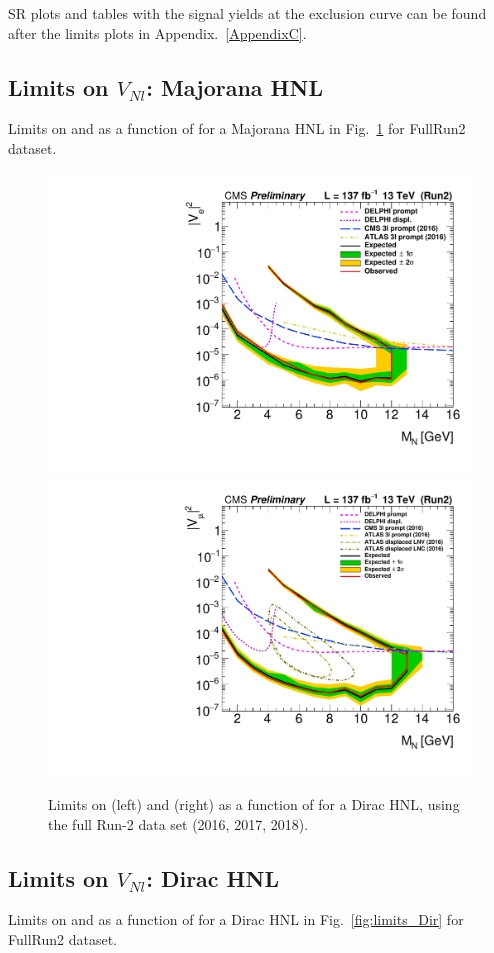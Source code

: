 SR plots and tables with the signal yields at the exclusion curve can be found after the limits plots in Appendix.~\ref{AppendixC}.
\subsection{Limits on $V_{Nl}$: Majorana HNL}
Limits on \mixpare and \mixparm as a function of \mhnl for a Majorana HNL in
Fig.~\ref{fig:limits_Maj} for FullRun2 dataset.
\begin{figure}[h]
  \centering
  \includegraphics[width=.49\textwidth]{Figures/c6/results/limits/majorana/comb/signalStrength_e_ele_limits.pdf}
  \hfill{}
  \includegraphics[width=.49\textwidth]{Figures/c6/results/limits/majorana/comb/signalStrength_mu_muo_limits.pdf}
  \caption{Limits on \mixpare (left) and \mixparm (right) as a
    function of \mhnl for a Dirac HNL, using the full Run-2 data set
    (2016, 2017, 2018).}
  \label{fig:limits_Maj}
\end{figure}

\subsection{Limits on $V_{Nl}$: Dirac HNL}

Limits on \mixpare and \mixparm as a function of \mhnl for a Dirac HNL in
Fig.~\ref{fig:limits_Dir} for FullRun2 dataset.


